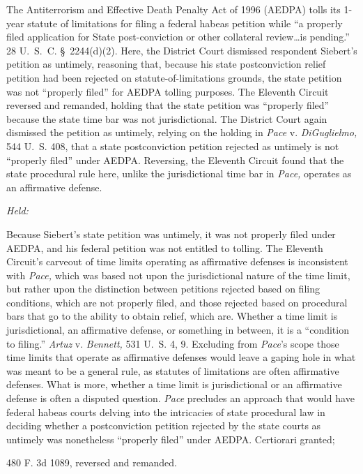 
\setcounter{page}{3}

  The Antiterrorism and Effective Death Penalty Act of 1996 (AEDPA)
tolls its 1-year statute of limitations for filing a federal
habeas petition while ``a properly filed application for State
post-conviction or other collateral review\dots is pending.''
28 U.~S.~C. \S~2244(d)(2). Here, the District Court dismissed
respondent Siebert's petition as untimely, reasoning that, because
his state postconviction relief petition had been rejected on
statute-of-limitations grounds, the state petition was not ``properly
filed'' for AEDPA tolling purposes. The Eleventh Circuit reversed and
remanded, holding that the state petition was ``properly filed''
because the state time bar was not jurisdictional. The District Court
again dismissed the petition as untimely, relying on the holding
in \emph{Pace} v. \emph{DiGuglielmo,} 544 U.~S. 408, that a state
postconviction petition rejected as untimely is not ``properly filed''
under AEDPA. Reversing, the Eleventh Circuit found that the state
procedural rule here, unlike the jurisdictional time bar in \emph{Pace,}
operates as an affirmative defense.

\emph{Held:}

  Because Siebert's state petition was untimely, it was not properly
filed under AEDPA, and his federal petition was not entitled to
tolling. The Eleventh Circuit's carveout of time limits operating as
affirmative defenses is inconsistent with \emph{Pace,} which was based not
upon the jurisdictional nature of the time limit, but rather upon the
distinction between petitions rejected based on filing conditions, which
are not properly filed, and those rejected based on procedural bars that
go to the ability to obtain relief, which are. Whether a time limit is
jurisdictional, an affirmative defense, or something in between, it is
a ``condition to filing.'' \emph{Artuz} v. \emph{Bennett,} 531 U.~S. 4,
9. Excluding from \emph{Pace}'s scope those time limits that operate as
affirmative defenses would leave a gaping hole in what was meant to be a
general rule, as statutes of limitations are often affirmative defenses.
What is more, whether a time limit is jurisdictional or an affirmative
defense is often a disputed question. \emph{Pace} precludes an approach
that would have federal habeas courts delving into the intricacies of
state procedural law in deciding whether a postconviction petition
rejected by the state courts as untimely was nonetheless ``properly
filed'' under AEDPA. Certiorari granted;

480 F. 3d 1089, reversed and remanded.
